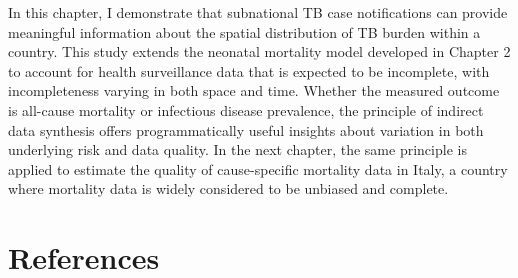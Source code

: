 \documentclass[
]{article}
\begin{document}
In this chapter, I demonstrate that subnational TB case notifications can provide meaningful information about the spatial distribution of TB burden within a country. This study extends the neonatal mortality model developed in Chapter 2 to account for health surveillance data that is expected to be incomplete, with incompleteness varying in both space and time. Whether the measured outcome is all-cause mortality or infectious disease prevalence, the principle of indirect data synthesis offers programmatically useful insights about variation in both underlying risk and data quality. In the next chapter, the same principle is applied to estimate the quality of cause-specific mortality data in Italy, a country where mortality data is widely considered to be unbiased and complete.

\hypertarget{references}{%
\section{References}\label{references}}
\end{document}
